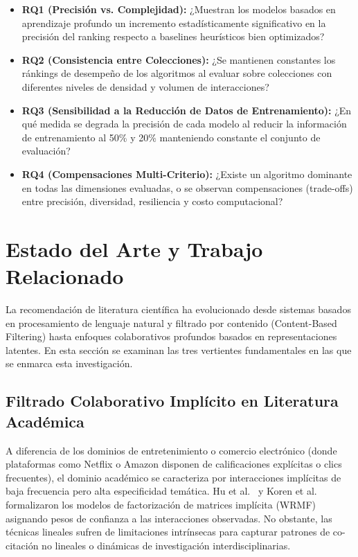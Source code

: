 \documentclass[journal]{IEEEtran}
\begin{document}
\begin{itemize}
    \item \textbf{RQ1 (Precisión vs. Complejidad):} ¿Muestran los modelos basados en aprendizaje profundo un incremento estadísticamente significativo en la precisión del ranking respecto a baselines heurísticos bien optimizados?
    \item \textbf{RQ2 (Consistencia entre Colecciones):} ¿Se mantienen constantes los ránkings de desempeño de los algoritmos al evaluar sobre colecciones con diferentes niveles de densidad y volumen de interacciones?
    \item \textbf{RQ3 (Sensibilidad a la Reducción de Datos de Entrenamiento):} ¿En qué medida se degrada la precisión de cada modelo al reducir la información de entrenamiento al 50\% y 20\% manteniendo constante el conjunto de evaluación?
    \item \textbf{RQ4 (Compensaciones Multi-Criterio):} ¿Existe un algoritmo dominante en todas las dimensiones evaluadas, o se observan compensaciones (trade-offs) entre precisión, diversidad, resiliencia y costo computacional?
\end{itemize}

\section{Estado del Arte y Trabajo Relacionado}
\label{sec:estado_arte}

La recomendación de literatura científica ha evolucionado desde sistemas basados en procesamiento de lenguaje natural y filtrado por contenido (Content-Based Filtering) hasta enfoques colaborativos profundos basados en representaciones latentes. En esta sección se examinan las tres vertientes fundamentales en las que se enmarca esta investigación.

\subsection{Filtrado Colaborativo Implícito en Literatura Académica}
A diferencia de los dominios de entretenimiento o comercio electrónico (donde plataformas como Netflix o Amazon disponen de calificaciones explícitas o clics frecuentes), el dominio académico se caracteriza por interacciones implícitas de baja frecuencia pero alta especificidad temática. Hu et al.~\cite{hu2008collaborative} y Koren et al.~\cite{koren2009matrix} formalizaron los modelos de factorización de matrices implícita (WRMF) asignando pesos de confianza a las interacciones observadas. No obstante, las técnicas lineales sufren de limitaciones intrínsecas para capturar patrones de co-citación no lineales o dinámicas de investigación interdisciplinarias.
\end{document}
